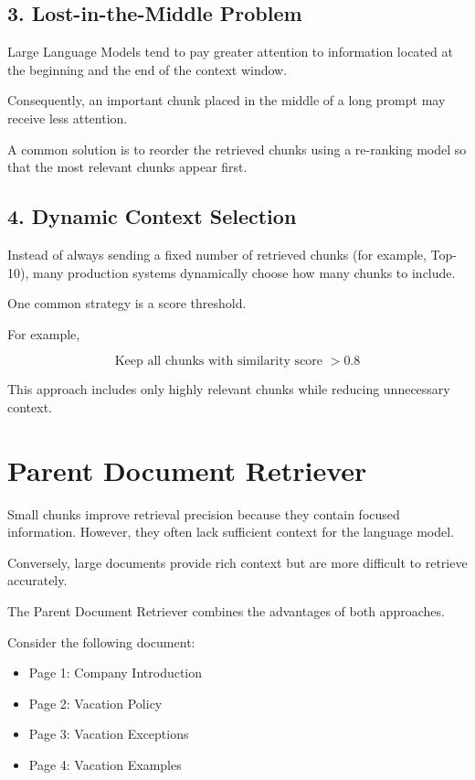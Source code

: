 \subsection*{3. Lost-in-the-Middle Problem}

Large Language Models tend to pay greater attention to information located at the beginning and the end of the context window.

Consequently, an important chunk placed in the middle of a long prompt may receive less attention.

A common solution is to reorder the retrieved chunks using a re-ranking model so that the most relevant chunks appear first.

\subsection*{4. Dynamic Context Selection}

Instead of always sending a fixed number of retrieved chunks (for example, Top-10), many production systems dynamically choose how many chunks to include.

One common strategy is a score threshold.

For example,

\[
\text{Keep all chunks with similarity score } > 0.8
\]

This approach includes only highly relevant chunks while reducing unnecessary context.
\section{Parent Document Retriever}

Small chunks improve retrieval precision because they contain focused information. However, they often lack sufficient context for the language model.

Conversely, large documents provide rich context but are more difficult to retrieve accurately.

The Parent Document Retriever combines the advantages of both approaches.

Consider the following document:

\begin{itemize}
    \item Page 1: Company Introduction
    \item Page 2: Vacation Policy
    \item Page 3: Vacation Exceptions
    \item Page 4: Vacation Examples
\end{itemize}

